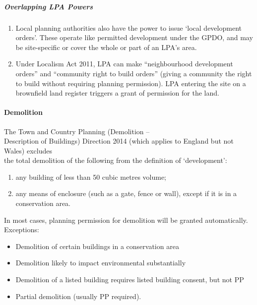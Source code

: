 \documentclass[
]{article}
\providecommand{\tightlist}{%
  \setlength{\itemsep}{0pt}\setlength{\parskip}{0pt}}
\begin{document}
\hypertarget{overlapping-lpa-powers}{%
\subparagraph{Overlapping LPA Powers}\label{overlapping-lpa-powers}}

\begin{enumerate}
\def\labelenumi{\arabic{enumi}.}
\tightlist
\item
  Local planning authorities also have the power to issue `local
  development orders'. These operate like permitted development under
  the GPDO, and may be site-specific or cover the whole or part of an
  LPA's area.
\item
  Under Localism Act 2011, LPA can make ``neighbourhood development
  orders'' and ``community right to build orders'' (giving a community
  the right to build without requiring planning permission). LPA
  entering the site on a brownfield land register triggers a grant of
  permission for the land.
\end{enumerate}

\hypertarget{demolition}{%
\paragraph{Demolition}\label{demolition}}

The Town and Country Planning (Demolition --\\
Description of Buildings) Direction 2014 (which applies to England but
not Wales) excludes\\
the total demolition of the following from the definition of
`development':

\begin{enumerate}
\def\labelenumi{\arabic{enumi}.}
\tightlist
\item
  any building of less than 50 cubic metres volume;
\item
  any means of enclosure (such as a gate, fence or wall), except if it
  is in a conservation area.
\end{enumerate}

In most cases, planning permission for demolition will be granted
automatically. Exceptions:

\begin{itemize}
\tightlist
\item
  Demolition of certain buildings in a conservation area
\item
  Demolition likely to impact environmental substantially
\item
  Demolition of a listed building requires listed building consent, but
  not PP
\item
  Partial demolition (usually PP required).
\end{itemize}
\end{document}
